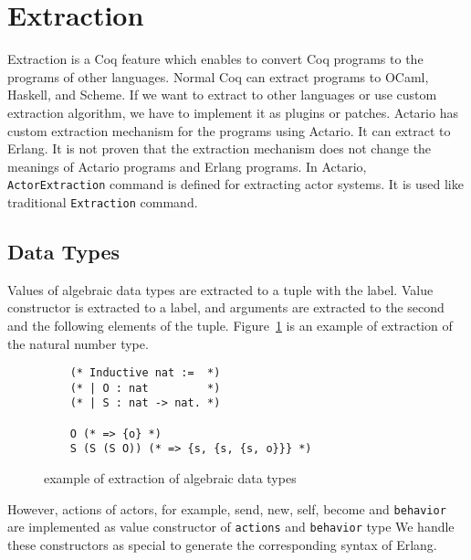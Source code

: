 \section{Extraction}
\label{sec:extraction}

Extraction is a Coq feature which enables to convert Coq programs to the programs of other languages.
Normal Coq can extract programs to OCaml, Haskell, and Scheme.
If we want to extract to other languages or use custom extraction algorithm, we have to implement it as plugins or patches.
Actario has custom extraction mechanism for the programs using Actario.
It can extract to Erlang.
It is not proven that the extraction mechanism does not change the meanings of Actario programs and Erlang programs.
In Actario, \lstinline|ActorExtraction| command is defined for extracting actor systems.
It is used like traditional \lstinline|Extraction| command.

\subsection{Data Types}

Values of algebraic data types are extracted to a tuple with the label.
Value constructor is extracted to a label, and arguments are extracted to the second and the following elements of the tuple.
Figure~\ref{coq:adt} is an example of extraction of the natural number type.

\begin{figure}[t]
  \begin{lstlisting}
    (* Inductive nat :=  *)
    (* | O : nat         *)
    (* | S : nat -> nat. *)

    O (* => {o} *)
    S (S (S O)) (* => {s, {s, {s, o}}} *)
  \end{lstlisting}
  \caption{example of extraction of algebraic data types}\label{coq:adt}
\end{figure}

However, actions of actors, for example, \textsf{send}, \textsf{new}, \textsf{self}, \textsf{become} and \texttt{behavior} are implemented as value constructor of \texttt{actions} and \texttt{behavior} type
We handle these constructors as special to generate the corresponding syntax of Erlang.


